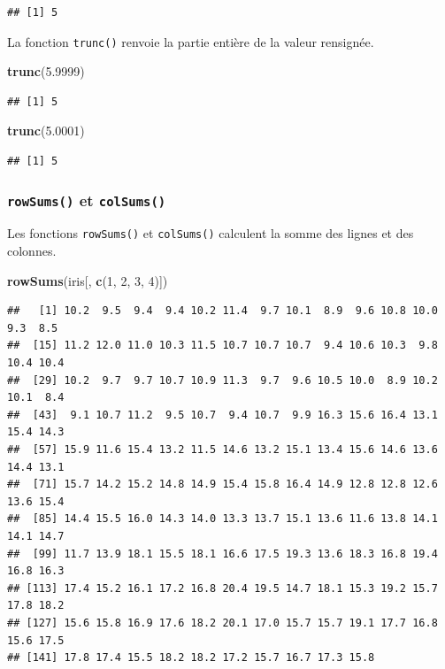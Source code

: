 \documentclass[]{book}
\newenvironment{Shaded}{\begin{snugshade}}{\end{snugshade}}
\newcommand{\DecValTok}[1]{\textcolor[rgb]{0.00,0.00,0.81}{#1}}
\newcommand{\FloatTok}[1]{\textcolor[rgb]{0.00,0.00,0.81}{#1}}
\newcommand{\KeywordTok}[1]{\textcolor[rgb]{0.13,0.29,0.53}{\textbf{#1}}}
\newcommand{\NormalTok}[1]{#1}
\begin{document}
\begin{verbatim}
## [1] 5
\end{verbatim}

La fonction \texttt{trunc()} renvoie la partie entière de la valeur rensignée.

\begin{Shaded}
\begin{Highlighting}[]
\KeywordTok{trunc}\NormalTok{(}\FloatTok{5.9999}\NormalTok{)}
\end{Highlighting}
\end{Shaded}

\begin{verbatim}
## [1] 5
\end{verbatim}

\begin{Shaded}
\begin{Highlighting}[]
\KeywordTok{trunc}\NormalTok{(}\FloatTok{5.0001}\NormalTok{)}
\end{Highlighting}
\end{Shaded}

\begin{verbatim}
## [1] 5
\end{verbatim}

\hypertarget{l015rowsums}{%
\subsubsection{\texorpdfstring{\texttt{rowSums()} et \texttt{colSums()}}{rowSums() et colSums()}}\label{l015rowsums}}

Les fonctions \texttt{rowSums()} et \texttt{colSums()} calculent la somme des lignes et des colonnes.

\begin{Shaded}
\begin{Highlighting}[]
\KeywordTok{rowSums}\NormalTok{(iris[, }\KeywordTok{c}\NormalTok{(}\DecValTok{1}\NormalTok{, }\DecValTok{2}\NormalTok{, }\DecValTok{3}\NormalTok{, }\DecValTok{4}\NormalTok{)])}
\end{Highlighting}
\end{Shaded}

\begin{verbatim}
##   [1] 10.2  9.5  9.4  9.4 10.2 11.4  9.7 10.1  8.9  9.6 10.8 10.0  9.3  8.5
##  [15] 11.2 12.0 11.0 10.3 11.5 10.7 10.7 10.7  9.4 10.6 10.3  9.8 10.4 10.4
##  [29] 10.2  9.7  9.7 10.7 10.9 11.3  9.7  9.6 10.5 10.0  8.9 10.2 10.1  8.4
##  [43]  9.1 10.7 11.2  9.5 10.7  9.4 10.7  9.9 16.3 15.6 16.4 13.1 15.4 14.3
##  [57] 15.9 11.6 15.4 13.2 11.5 14.6 13.2 15.1 13.4 15.6 14.6 13.6 14.4 13.1
##  [71] 15.7 14.2 15.2 14.8 14.9 15.4 15.8 16.4 14.9 12.8 12.8 12.6 13.6 15.4
##  [85] 14.4 15.5 16.0 14.3 14.0 13.3 13.7 15.1 13.6 11.6 13.8 14.1 14.1 14.7
##  [99] 11.7 13.9 18.1 15.5 18.1 16.6 17.5 19.3 13.6 18.3 16.8 19.4 16.8 16.3
## [113] 17.4 15.2 16.1 17.2 16.8 20.4 19.5 14.7 18.1 15.3 19.2 15.7 17.8 18.2
## [127] 15.6 15.8 16.9 17.6 18.2 20.1 17.0 15.7 15.7 19.1 17.7 16.8 15.6 17.5
## [141] 17.8 17.4 15.5 18.2 18.2 17.2 15.7 16.7 17.3 15.8
\end{verbatim}
\end{document}
